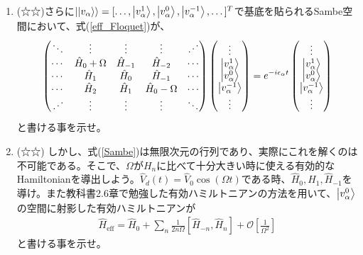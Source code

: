 \documentclass[a4paper,12pt]{jsarticle}
\renewcommand{\order}[1]{\mathcal{O}[ #1 ]}
\newcommand{\h}[1]{\hat{#1}}
\begin{document}
\begin{enumerate}
\item (☆☆)さらに$\ket{\ket{v_\alpha}} = [\dots, \ket{v_\alpha^1}, \ket{v_\alpha^0}, \ket{v_\alpha^{-1}}, \dots]^T$で基底を貼られるSambe空間において、式(\ref{eff_Floquet})が、
\begin{eqnarray}
  \begin{pmatrix}
    \ddots & \vdots & \vdots & \vdots & \iddots\\
    \cdots & \h{H}_0 + \Omega & \h{H}_{-1} & \h{H}_{-2} & \cdots\\
    \cdots & \h{H}_1 & \h{H}_0 & \h{H}_{-1} & \cdots\\
    \cdots & \h{H}_2 & \h{H}_1 & \h{H}_0 -\Omega & \cdots\\
    \iddots & \vdots & \vdots & \vdots & \ddots
  \end{pmatrix}\begin{pmatrix}
    \vdots\\
    \ket{v_\alpha^1}\\
    \ket{v_\alpha^0}\\
    \ket{v_\alpha^{-1}}\\
    \vdots
  \end{pmatrix} = 
  e^{-i\epsilon_\alpha t}\begin{pmatrix}
    \vdots\\
    \ket{v_\alpha^1}\\
    \ket{v_\alpha^0}\\
    \ket{v_\alpha^{-1}}\\
    \vdots
\end{pmatrix}\label{Sambe}
\end{eqnarray}
と書ける事を示せ。
\item (☆☆) しかし、式(\ref{Sambe})は無限次元の行列であり、実際にこれを解くのは不可能である。そこで、$\Omega$が$H_n$に比べて十分大きい時に使える有効的なHamiltonianを導出しよう。$\h{V}_d(t) = \h{V}_0 \cos(\Omega t)$である時、$\h{H}_0, \h{H}_1, \h{H}_{-1}$を導け。また教科書2.6章で勉強した有効ハミルトニアンの方法を用いて、$\ket{v_\alpha^0}$の空間に射影した有効ハミルトニアンが
\begin{eqnarray}
  \h{H}_\mathrm{eff} = \h{H}_0 + \sum_n\frac{1}{2n\Omega}[\h{H}_{-n}, \h{H}_{n}] + \order{\frac{1}{\Omega^2}}
\end{eqnarray}
と書ける事を示せ。
\end{enumerate}
\end{document}
